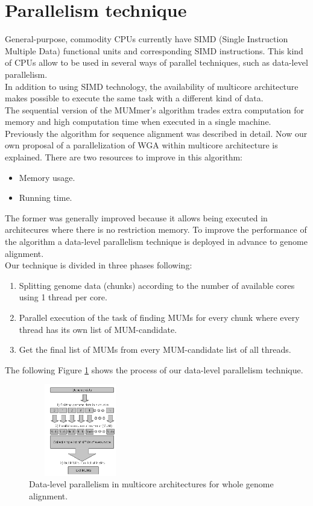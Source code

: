 \documentclass[3p,times]{elsarticle}
\begin{document}
\section{Parallelism technique} 
General-purpose, commodity CPUs currently have SIMD (Single Instruction Multiple Data) functional units and corresponding SIMD instructions. This kind of CPUs allow to be used in several ways of parallel techniques, such as data-level parallelism. \\
In addition to using SIMD technology, the availability of multicore architecture makes possible to execute the same task with a different kind of data.\\
The sequential version of the MUMmer's algorithm trades extra computation for memory and high computation time when executed in a single machine. \\
Previously the algorithm for sequence alignment was described in detail. Now our own proposal of a parallelization of WGA within multicore architecture is explained. There are two resources to improve in this algorithm:
\begin{itemize}
\item Memory usage.
\item Running time.
\end{itemize}
The former was generally improved because it allows being executed in architecures where there is no restriction memory. To improve the performance of the algorithm a data-level parallelism technique is deployed in advance to genome alignment.\\
Our technique is divided in three phases following:
\begin{enumerate}
\item Splitting genome data (chunks) according to the number of available cores using 1 thread per core.
\item Parallel execution of the task of finding MUMs for every chunk where every thread has its own list of MUM-candidate.
\item Get the final list of MUMs from every MUM-candidate list of all threads.
\end{enumerate}
The following Figure \ref{algorithm} shows the process of our data-level parallelism technique.
\begin{figure}[htb]  
\begin{center} 
  \includegraphics[width=4.5cm,height=4cm]{algorithm.png}
\end{center} 
\caption{Data-level parallelism in multicore architectures for whole genome alignment.} 
\label{algorithm} 
\end{figure} 
\end{document}
